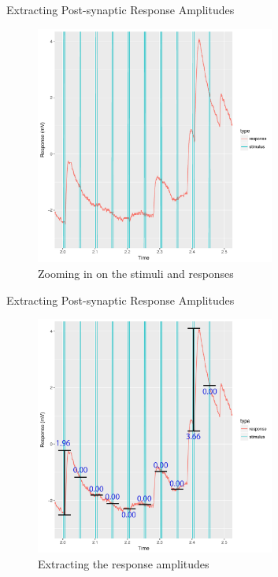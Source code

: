 \documentclass{beamer}
\begin{document}
\begin{frame}{Extracting Post-synaptic Response Amplitudes}
  \begin{figure}
    \centering
    \includegraphics[width = 0.7\textwidth]{./wave-data-zoom.pdf}
    \caption{Zooming in on the stimuli and responses}
  \end{figure}
\end{frame}

\begin{frame}{Extracting Post-synaptic Response Amplitudes}
  \begin{figure}
    \centering
    \includegraphics[width = 0.7\textwidth]{./label-wave-data.png}
    \caption{Extracting the response amplitudes}
  \end{figure}
\end{frame}
\end{document}
